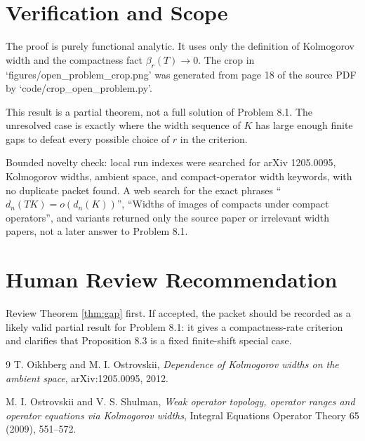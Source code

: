 \documentclass[11pt]{article}
\begin{document}
\section*{Verification and Scope}

The proof is purely functional analytic.  It uses only the definition of
Kolmogorov width and the compactness fact \(\beta_r(T)\to0\).  The crop
in `figures/open\_problem\_crop.png' was generated from page 18 of the
source PDF by `code/crop\_open\_problem.py'.

This result is a partial theorem, not a full solution of Problem 8.1.
The unresolved case is exactly where the width sequence of \(K\) has
large enough finite gaps to defeat every possible choice of \(r\) in the
criterion.

Bounded novelty check: local run indexes were searched for arXiv
1205.0095, Kolmogorov widths, ambient space, and compact-operator width
keywords, with no duplicate packet found.  A web search for the exact
phrases ``\(d_n(TK)=o(d_n(K))\)'', ``Widths of images of compacts under
compact operators'', and variants returned only the source paper or
irrelevant width papers, not a later answer to Problem 8.1.

\section*{Human Review Recommendation}

Review Theorem \ref{thm:gap} first.  If accepted, the packet should be
recorded as a likely valid partial result for Problem 8.1: it gives a
compactness-rate criterion and clarifies that Proposition 8.3 is a fixed
finite-shift special case.

\begin{thebibliography}{9}
T. Oikhberg and M. I. Ostrovskii,
\emph{Dependence of Kolmogorov widths on the ambient space},
arXiv:1205.0095, 2012.

M. I. Ostrovskii and V. S. Shulman,
\emph{Weak operator topology, operator ranges and operator equations via
Kolmogorov widths},
Integral Equations Operator Theory 65 (2009), 551--572.
\end{thebibliography}
\end{document}

